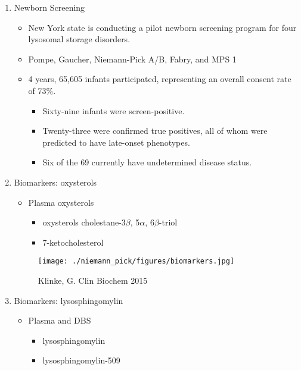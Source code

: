 \documentclass{scrartcl}
\begin{document}
\begin{enumerate}
\item Newborn Screening
\label{sec:orgca6ad2c}
\begin{itemize}
\item New York state is conducting a pilot newborn screening program for four lysosomal storage disorders.
\item Pompe, Gaucher, Niemann-Pick A/B, Fabry, and MPS 1

\item 4 years, 65,605 infants participated, representing an overall consent rate of 73\%.
\begin{itemize}
\item Sixty-nine infants were screen-positive.
\item Twenty-three were confirmed true positives, all of whom were predicted to have late-onset phenotypes.
\item Six of the 69 currently have undetermined disease status.
\end{itemize}
\end{itemize}

\item Biomarkers: oxysterols
\label{sec:org69d4150}

\begin{itemize}
\item Plasma oxysterols
\begin{itemize}
\item oxysterols cholestane-3\(\beta\), 5\(\alpha\), 6\(\beta\)-triol
\item 7-ketocholesterol
\end{itemize}
\end{itemize}



\begin{figure}[htbp]
\centering
\texttt{[image: ./niemann\_pick/figures/biomarkers.jpg]}
\caption{\label{fig:orgd9d2ee6}
Klinke, G. Clin Biochem 2015}
\end{figure}

\item Biomarkers: lysosphingomylin
\label{sec:orga8d3b84}

\begin{itemize}
\item Plasma and DBS
\begin{itemize}
\item lysosphingomylin
\item lysosphingomylin-509
\end{itemize}
\end{itemize}


\end{enumerate}
\end{document}
